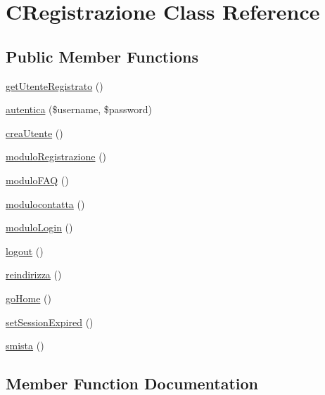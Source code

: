 \hypertarget{class_c_registrazione}{}\section{C\+Registrazione Class Reference}
\label{class_c_registrazione}
\subsection*{Public Member Functions}
\begin{DoxyCompactItemize}
\item 
\mbox{\hyperlink{class_c_registrazione_ab0cf6298bf4374f5eaf9ee6b08d4c975}{get\+Utente\+Registrato}} ()
\item 
\mbox{\hyperlink{class_c_registrazione_ae5ba060ec4288c5b3a6060db64300201}{autentica}} (\$username, \$password)
\item 
\mbox{\hyperlink{class_c_registrazione_a6774502b5cf78e810735a88e9f4b7127}{crea\+Utente}} ()
\item 
\mbox{\hyperlink{class_c_registrazione_a95fb25c8c8477504e3bb4f684691a31c}{modulo\+Registrazione}} ()
\item 
\mbox{\hyperlink{class_c_registrazione_a45538c1ae0a7b43b28341e95bdf2fea1}{modulo\+F\+AQ}} ()
\item 
\mbox{\hyperlink{class_c_registrazione_a915ca538df41be1b1ec64476d35cef91}{modulocontatta}} ()
\item 
\mbox{\hyperlink{class_c_registrazione_a16420af27b3863dacf52df64aa28b59f}{modulo\+Login}} ()
\item 
\mbox{\hyperlink{class_c_registrazione_a32d91897b6558bf53694479719b99195}{logout}} ()
\item 
\mbox{\hyperlink{class_c_registrazione_aaf2b63786c125112efbb374fd6e102ba}{reindirizza}} ()
\item 
\mbox{\hyperlink{class_c_registrazione_a314d300147605fbd772a5f9ca22d4c35}{go\+Home}} ()
\item 
\mbox{\hyperlink{class_c_registrazione_a499d6dfd36434599a9d2642c47ab4dcf}{set\+Session\+Expired}} ()
\item 
\mbox{\hyperlink{class_c_registrazione_a6f90c5c3fdb0f0dde421f89172f4bdd0}{smista}} ()
\end{DoxyCompactItemize}


\subsection{Member Function Documentation}
\mbox{\label{class_c_registrazione_ae5ba060ec4288c5b3a6060db64300201}} 

